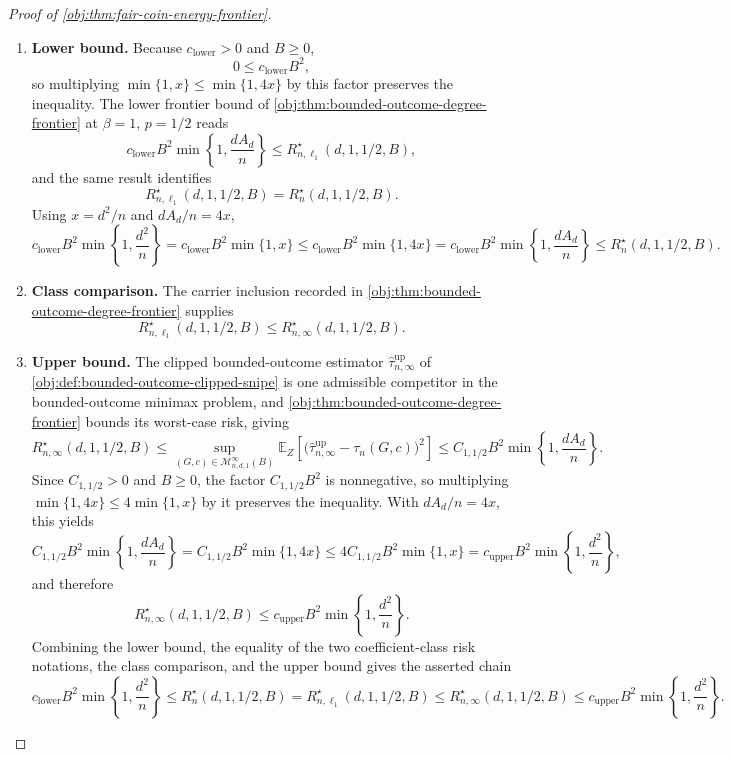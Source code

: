 \begin{proof}[Proof of \cref{obj:thm:fair-coin-energy-frontier}]
\begin{enumerate}
\item \textbf{Lower bound.}
Because \(c_{\mathrm{lower}}>0\) and \(B\ge0\),
\[
0\le c_{\mathrm{lower}}B^2,
\]
so multiplying \(\min\{1,x\}\le\min\{1,4x\}\) by this factor preserves the inequality. %
The lower frontier bound of \cref{obj:thm:bounded-outcome-degree-frontier} at \(\beta=1\), \(p=1/2\) reads
\[
c_{\mathrm{lower}}B^2\min\!\left\{1,\frac{dA_d}{n}\right\}
\le
R_{n,\ell_1}^{\star}(d,1,1/2,B),
\]
and the same result identifies
\[
R_{n,\ell_1}^{\star}(d,1,1/2,B)
=
R_n^\star(d,1,1/2,B).
\]
Using \(x=d^2/n\) and \(dA_d/n=4x\),
\[
c_{\mathrm{lower}}B^2\min\!\left\{1,\frac{d^2}{n}\right\}
=
c_{\mathrm{lower}}B^2\min\{1,x\}
\le
c_{\mathrm{lower}}B^2\min\{1,4x\}
=
c_{\mathrm{lower}}B^2\min\!\left\{1,\frac{dA_d}{n}\right\}
\le
R_n^\star(d,1,1/2,B).
\] %

\item \textbf{Class comparison.}
The carrier inclusion recorded in \cref{obj:thm:bounded-outcome-degree-frontier} supplies
\[
R_{n,\ell_1}^{\star}(d,1,1/2,B)
\le
R_{n,\infty}^{\star}(d,1,1/2,B).
\] %

\item \textbf{Upper bound.}
The clipped bounded-outcome estimator \(\widehat\tau_{n,\infty}^{\mathrm{up}}\) of \cref{obj:def:bounded-outcome-clipped-snipe} is one admissible competitor in the bounded-outcome minimax problem, and \cref{obj:thm:bounded-outcome-degree-frontier} bounds its worst-case risk, giving
\[
R_{n,\infty}^{\star}(d,1,1/2,B)
\le
\sup_{(G,c)\in\mathcal M_{n,d,1}^{\infty}(B)}
\mathbb E_Z\!\left[
\bigl(\widehat\tau_{n,\infty}^{\mathrm{up}}-\tau_n(G,c)\bigr)^2
\right]
\le
C_{1,1/2}B^2\min\!\left\{1,\frac{dA_d}{n}\right\}.
\]
Since \(C_{1,1/2}>0\) and \(B\ge0\), the factor \(C_{1,1/2}B^2\) is nonnegative, so multiplying \(\min\{1,4x\}\le4\min\{1,x\}\) by it preserves the inequality.  With \(dA_d/n=4x\), this yields
\[
C_{1,1/2}B^2\min\!\left\{1,\frac{dA_d}{n}\right\}
=
C_{1,1/2}B^2\min\{1,4x\}
\le
4C_{1,1/2}B^2\min\{1,x\}
=
c_{\mathrm{upper}}B^2\min\!\left\{1,\frac{d^2}{n}\right\},
\]
and therefore
\[
R_{n,\infty}^{\star}(d,1,1/2,B)
\le
c_{\mathrm{upper}}B^2\min\!\left\{1,\frac{d^2}{n}\right\}.
\] %
Combining the lower bound, the equality of the two coefficient-class risk notations, the class comparison, and the upper bound gives the asserted chain
\[
c_{\mathrm{lower}}B^2\min\!\left\{1,\frac{d^2}{n}\right\}
\le
R_n^\star(d,1,1/2,B)
=
R_{n,\ell_1}^\star(d,1,1/2,B)
\le
R_{n,\infty}^\star(d,1,1/2,B)
\le
c_{\mathrm{upper}}B^2\min\!\left\{1,\frac{d^2}{n}\right\}.
\]


\end{enumerate}
\end{proof}
